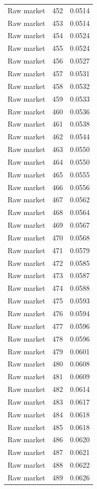 \begin{table}[htbp]
\begin{tabular}{lll}
Raw market & 452 & 0.0514 \\
Raw market & 453 & 0.0514 \\
Raw market & 454 & 0.0524 \\
Raw market & 455 & 0.0524 \\
Raw market & 456 & 0.0527 \\
Raw market & 457 & 0.0531 \\
Raw market & 458 & 0.0532 \\
Raw market & 459 & 0.0533 \\
Raw market & 460 & 0.0536 \\
Raw market & 461 & 0.0538 \\
Raw market & 462 & 0.0544 \\
Raw market & 463 & 0.0550 \\
Raw market & 464 & 0.0550 \\
Raw market & 465 & 0.0555 \\
Raw market & 466 & 0.0556 \\
Raw market & 467 & 0.0562 \\
Raw market & 468 & 0.0564 \\
Raw market & 469 & 0.0567 \\
Raw market & 470 & 0.0568 \\
Raw market & 471 & 0.0579 \\
Raw market & 472 & 0.0585 \\
Raw market & 473 & 0.0587 \\
Raw market & 474 & 0.0588 \\
Raw market & 475 & 0.0593 \\
Raw market & 476 & 0.0594 \\
Raw market & 477 & 0.0596 \\
Raw market & 478 & 0.0596 \\
Raw market & 479 & 0.0601 \\
Raw market & 480 & 0.0608 \\
Raw market & 481 & 0.0609 \\
Raw market & 482 & 0.0614 \\
Raw market & 483 & 0.0617 \\
Raw market & 484 & 0.0618 \\
Raw market & 485 & 0.0618 \\
Raw market & 486 & 0.0620 \\
Raw market & 487 & 0.0621 \\
Raw market & 488 & 0.0622 \\
Raw market & 489 & 0.0626 \\

\end{tabular}
\end{table}
